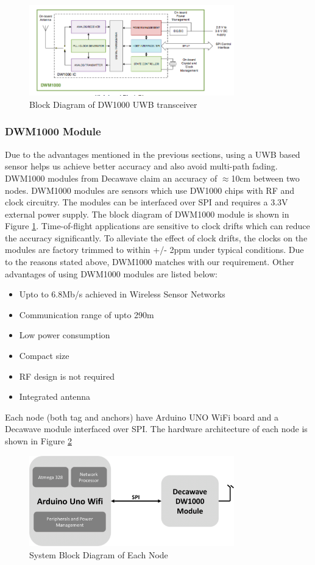 \documentclass[journal,transmag]{IEEEtran}
\begin{document}
\begin{figure}[!h]
\centering
\includegraphics[width=3.5in]{dw1000bd}
\caption{{Block Diagram of DW1000 UWB transceiver}}
\label{DW1000BD}
\end{figure}
\subsubsection{DWM1000 Module}
Due to the advantages mentioned in the previous sections, using a UWB based sensor helps us achieve better accuracy and also avoid multi-path fading. DWM1000 modules from Decawave claim an accuracy of $\approx$10cm between two nodes. DWM1000 modules are sensors which use DW1000 chips with RF and clock circuitry. The modules can be interfaced over SPI and requires a 3.3V external power supply. The block diagram of DWM1000 module is shown in Figure \ref{DW1000BD}. Time-of-flight applications are sensitive to clock drifts which can reduce the accuracy significantly. To alleviate the effect of clock drifts, the clocks on the modules are factory trimmed to within +/- 2ppm under typical conditions. Due to the reasons stated above, DWM1000 matches with our requirement. Other advantages of using DWM1000 modules are listed below:
\begin{itemize}
	\item Upto to 6.8Mb/s achieved in Wireless Sensor Networks
	\item Communication range of upto 290m
	\item Low power consumption
	\item Compact size
	\item RF design is not required
	\item Integrated antenna
\end{itemize}

Each node (both tag and anchors) have Arduino UNO WiFi board and a Decawave module interfaced over SPI. The hardware architecture of each node is shown in Figure \ref{EACHNODEBD}
\begin{figure}[!h]
\centering
\includegraphics[width=3.5in]{nodebd.png}
\caption{{System Block Diagram of Each Node}}
\label{EACHNODEBD}
\end{figure}
\end{document}
